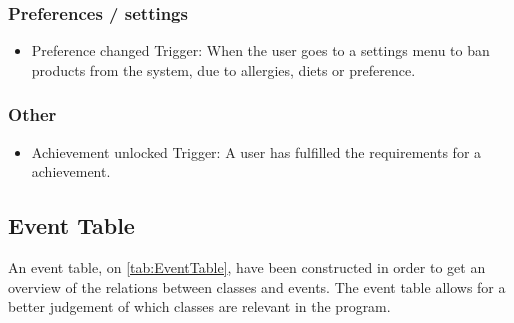\subsubsection{Preferences / settings}
\begin{itemize}
\item Preference changed
    \subitem Trigger: When the user goes to a settings menu to ban products from the system, due to allergies, diets or preference.
\end{itemize}


\subsubsection{Other}
\begin{itemize}
\item Achievement unlocked
    \subitem Trigger: A user has fulfilled the requirements for a achievement.
\end{itemize}

\subsection{Event Table}
An event table, on \cref{tab:EventTable},  have been constructed in order to get an overview of the relations between classes and events. The event table allows for a better judgement of which classes are relevant in the program.


